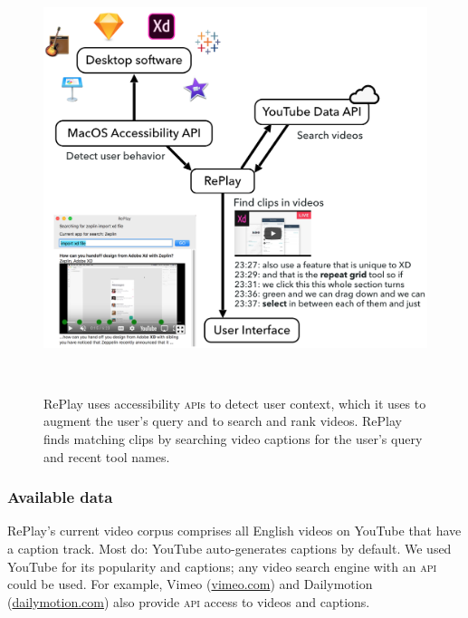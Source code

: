 \begin{figure}[b!]
\centering
\vspace{-0.2in}
  \includegraphics[width=\textwidth]{replay/figures/replay-system.png}
  \caption{RePlay uses accessibility \textsc{api}s to detect user context, which it uses to augment the user's query and to search and rank videos. RePlay finds matching clips by searching video captions for the user's query and recent tool names. }~\label{fig:replay-system}
  \vspace{-0.2in}
\end{figure}

\subsubsection{Available data}
RePlay's current video corpus comprises all English videos on YouTube that have a caption track. Most do: YouTube auto-generates captions by default. We used YouTube for its popularity and captions; any video search engine with an \textsc{api} could be used. For example, Vimeo (\url{vimeo.com}) and Dailymotion (\url{dailymotion.com}) also provide \textsc{api} access to videos and captions.

